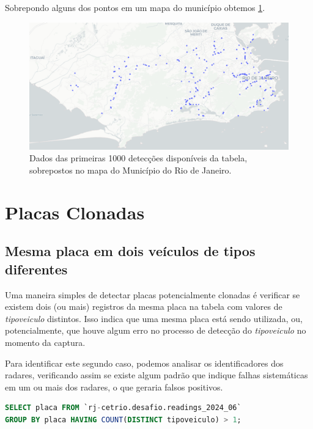 \documentclass{article}
\begin{document}
Sobrepondo alguns dos pontos em um mapa do município obtemos \ref{fig:disp1000Map}.

\begin{figure}
    \centering
    \includegraphics[width=1.0\linewidth]{disp1000Map2.png}
    \caption{Dados das primeiras 1000 detecções disponíveis da tabela, sobrepostos no mapa do Município do Rio de Janeiro.}
    \label{fig:disp1000Map}
\end{figure}

\section{Placas Clonadas}

\subsection{Mesma placa em dois veículos de tipos diferentes}

Uma maneira simples de detectar placas potencialmente clonadas é verificar se existem dois (ou mais) registros da mesma placa na tabela com valores de \textit{tipoveiculo} distintos. Isso indica que uma mesma placa está sendo utilizada, ou, potencialmente, que houve algum erro no processo de detecção do \textit{tipoveiculo} no momento da captura. 

Para identificar este segundo caso, podemos analisar os identificadores dos radares, verificando assim se existe algum padrão que indique falhas sistemáticas em um ou mais dos radares, o que geraria falsos positivos.

\begin{lstlisting}[language=SQL,caption={Query SQL para identificar inconsistências de placa com tipo de veículo. São retornadas todas as placas as quais existem dois (ou mais) registros na tabela com valores de \textit{tipoveiculo} distintos.},label={lst:sqlquery}]
SELECT placa FROM `rj-cetrio.desafio.readings_2024_06`
GROUP BY placa HAVING COUNT(DISTINCT tipoveiculo) > 1;
\end{lstlisting}
\end{document}
